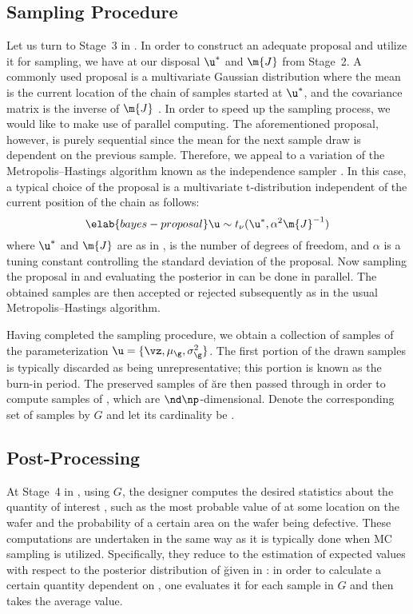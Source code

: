 \subsection{Sampling Procedure}

Let us turn to Stage~3 in . In order to construct an
adequate proposal and utilize it for sampling, we have at our disposal $\u^*$
and $\m{J}$ from Stage~2. A commonly used proposal is a multivariate Gaussian
distribution where the mean is the current location of the chain of samples
started at $\u^*$, and the covariance matrix is the inverse of $\m{J}$
\cite{gelman2013}. In order to speed up the sampling process, we would like to
make use of parallel computing. The aforementioned proposal, however, is purely
sequential since the mean for the next sample draw is dependent on the previous
sample. Therefore, we appeal to a variation of the Metropolis--Hastings
algorithm known as the independence sampler \cite{gelman2013}. In this case, a
typical choice of the proposal is a multivariate t-distribution independent of
the current position of the chain as follows:
\begin{equation} \elab{bayes-proposal}
  \u \sim t_\nu(\u^*, \alpha^2 \m{J}^{-1})
\end{equation}
where $\u^*$ and $\m{J}$ are as in , \nu is the number
of degrees of freedom, and $\alpha$ is a tuning constant controlling the
standard deviation of the proposal. Now sampling the proposal in
 and evaluating the posterior in  can
be done in parallel. The obtained samples are then accepted or rejected
subsequently as in the usual Metropolis--Hastings algorithm.

Having completed the sampling procedure, we obtain a collection of samples of
the parameterization $\u = \{ \vz, \mu_\g, \sigma^2_\g \}$. The first portion of
the drawn samples is typically discarded as being unrepresentative; this portion
is known as the burn-in period. The preserved samples of \u are then passed
through  in order to compute samples of \g, which are $\nd
\np$-dimensional. Denote the corresponding set of samples by $G$ and let its
cardinality be \no.

\subsection{Post-Processing}

At Stage~4 in , using $G$, the designer computes the
desired statistics about the quantity of interest \g, such as the most probable
value of \g at some location on the wafer and the probability of a certain area
on the wafer being defective. These computations are undertaken in the same way
as it is typically done when \ac{MC} sampling is utilized. Specifically, they
reduce to the estimation of expected values with respect to the posterior
distribution of \u given in : in order to calculate a
certain quantity dependent on \g, one evaluates it for each sample in $G$ and
then takes the average value.

